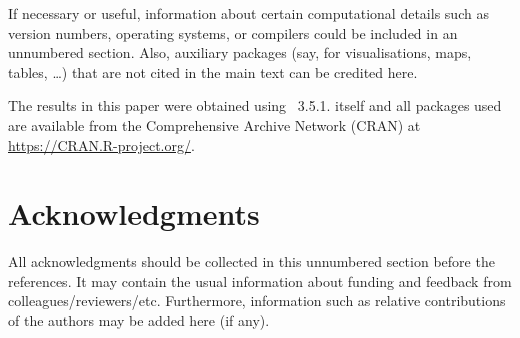 \documentclass[article]{jdssv}\usepackage[]{graphicx}\usepackage[]{color}
\begin{document}
If necessary or useful, information about certain computational details
such as version numbers, operating systems, or compilers could be included
in an unnumbered section. Also, auxiliary packages (say, for visualisations,
maps, tables, \dots) that are not cited in the main text can be credited here.


The results in this paper were obtained using
~3.5.1.  itself
and all packages used are available from the Comprehensive
 Archive Network (CRAN) at
\url{https://CRAN.R-project.org/}.


\section*{Acknowledgments}

All acknowledgments should be collected in this
unnumbered section before the references. It may contain the usual information
about funding and feedback from colleagues/reviewers/etc. Furthermore,
information such as relative contributions of the authors may be added here
(if any).







\newpage
\end{document}
